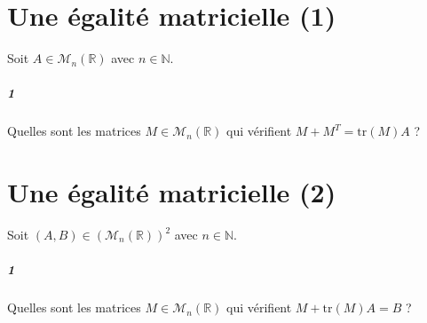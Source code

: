 \documentclass[10pt,a4paper]{article}
\begin{document}
\section{Une égalité matricielle (1)}
Soit $A \in \mathcal{M}_n \left( \mathbb{R} \right)$ avec $n \in \mathbb{N}$.
\subparagraph{1}Quelles sont les matrices $M \in \mathcal{M}_n \left( \mathbb{R} \right)$ qui vérifient $M+M^T = \text{tr}(M) A$ ?

\section{Une égalité matricielle (2)}
Soit $(A,B) \in \left( \mathcal{M}_n \left( \mathbb{R} \right) \right)^2$ avec $n \in \mathbb{N}$.
\subparagraph{1}Quelles sont les matrices $M \in \mathcal{M}_n \left( \mathbb{R} \right)$ qui vérifient $M + \text{tr}(M)A = B$ ?
\end{document}
